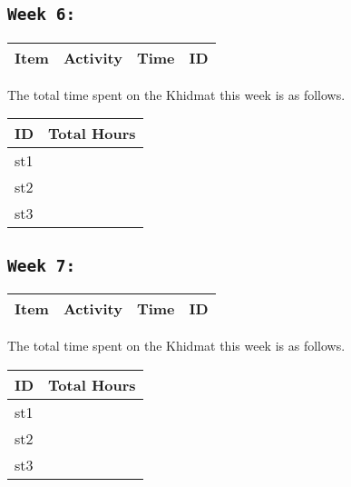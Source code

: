 \documentclass{article}
\begin{document}
\subsection{\texttt{Week 6: }}
\begin{center}
\begin{tabular}{|l|l|l|l|}
  \hline
  \textbf{Item} 	& \textbf{Activity} & \textbf{Time} & \textbf{ID} \\\hline
  
\end{tabular}
    
\end{center}
The total time spent on the Khidmat this week is as follows.    
\begin{center}
    
\begin{tabular}{|l|l|}
  \hline
  \textbf{ID} & \textbf{Total Hours}\\\hline
  st1 & \\\hline
  st2 & \\\hline
  st3 & \\\hline
\end{tabular}
\end{center}
\newpage
\subsection{\texttt{Week 7: }}
\begin{center}
\begin{tabular}{|l|l|l|l|}
  \hline
  \textbf{Item} 	& \textbf{Activity} & \textbf{Time} & \textbf{ID} \\\hline
  
\end{tabular}
    
\end{center}
The total time spent on the Khidmat this week is as follows.    
\begin{center}
    
\begin{tabular}{|l|l|}
  \hline
  \textbf{ID} & \textbf{Total Hours}\\\hline
  st1 & \\\hline
  st2 & \\\hline
  st3 & \\\hline
\end{tabular}
\end{center}
\newpage
\end{document}

